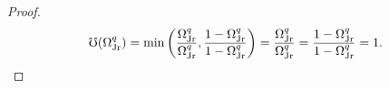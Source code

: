 \documentclass[hidelinks, nonatbib]{elsarticle}
\begin{document}
\begin{lemma}
\begin{proof}
        \begin{align}
            \mho(\Omega_{\text{Jr}}^{q}) 
            =
            \min\left(
                \frac{
                    \Omega_{\text{Jr}}^{q}
                }{
                    \Omega_{\text{Jr}}^{q}
                }
                ,
                \frac{
                    1 - \Omega_{\text{Jr}}^{q}
                }{
                    1 - \Omega_{\text{Jr}}^{q}
                }
            \right)
            =
            \frac{
                \Omega_{\text{Jr}}^{q}
            }{
                \Omega_{\text{Jr}}^{q}
            }
            =
            \frac{
                1 - \Omega_{\text{Jr}}^{q}
            }{
                1 - \Omega_{\text{Jr}}^{q}
            }
            =
            1
            .
        \end{align}
        

\end{proof}
\end{lemma}
\end{document}
